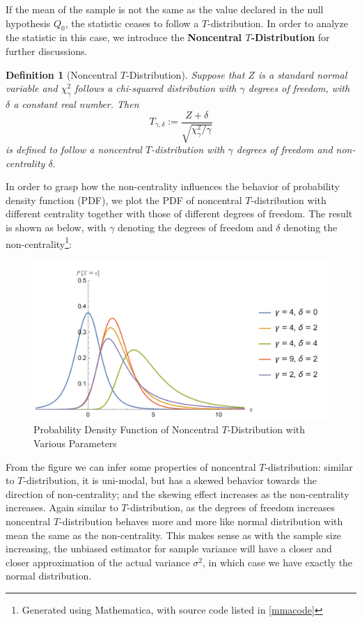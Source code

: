 \documentclass[12pt]{article}
\newtheorem{definition}{Definition}[section]
\begin{document}
If the mean of the sample is not the same as the value declared in the null hypothesis $Q_0$, the statistic ceases to follow a $T$-distribution. In order to analyze the statistic in this case, we introduce the \textbf{Noncentral $T$-Distribution} for further discussions. 

\begin{definition}[Noncentral $T$-Distribution]
    Suppose that $Z$ is a standard normal variable and $\chi_{\gamma}^2$ follows a chi-squared distribution with $\gamma$ degrees of freedom, with $\delta$ a constant real number. Then
    $$
    T_{\gamma, \delta} := \dfrac{Z + \delta}{\sqrt{\chi_{\gamma}^2/\gamma}}
    $$
    is defined to follow a noncentral $T$-distribution with $\gamma$ degrees of freedom and non-centrality $\delta$. 
\end{definition}

In order to grasp how the non-centrality influences the behavior of probability density function (PDF), we plot the PDF of noncentral $T$-distribution with different centrality together with those of different degrees of freedom. The result is shown as below, with $\gamma$ denoting the degrees of freedom and $\delta$ denoting the non-centrality\footnote{Generated using Mathematica, with source code listed in \ref{mmacode}}:

\begin{figure}[htbp]
    \centering
    \includegraphics[scale=0.65]{img/pdf_noncentral_t.png}
    \caption{Probability Density Function of Noncentral $T$-Distribution with Various Parameters}
\end{figure}

From the figure we can infer some properties of noncentral $T$-distribution: similar to $T$-distribution, it is uni-modal, but has a skewed behavior towards the direction of non-centrality; and the skewing effect increases as the non-centrality increases. Again similar to $T$-distribution, as the degrees of freedom increases noncentral $T$-distribution behaves more and more like normal distribution with mean the same as the non-centrality. This makes sense as with the sample size increasing, the unbiased estimator for sample variance will have a closer and closer approximation of the actual variance $\sigma^2$, in which case we have exactly the normal distribution.
\end{document}
